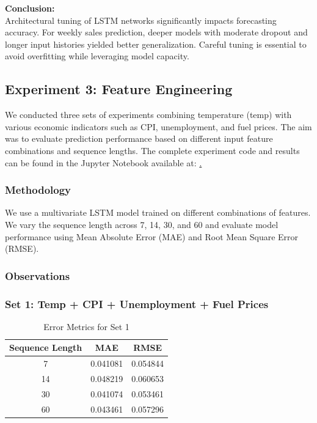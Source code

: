 \documentclass[conference]{IEEEtran}
\begin{document}
\textbf{Conclusion:} \\
Architectural tuning of LSTM networks significantly impacts forecasting accuracy. For weekly sales prediction, deeper models with moderate dropout and longer input histories yielded better generalization. Careful tuning is essential to avoid overfitting while leveraging model capacity.

\subsection{Experiment 3: Feature Engineering}
We conducted three sets of experiments combining temperature (temp) with various economic indicators such as CPI, unemployment, and fuel prices. The aim was to evaluate prediction performance based on different input feature combinations and sequence lengths. The complete experiment code and results can be found in the Jupyter Notebook available at: \href{https://drive.google.com/drive/folders/1Blwt9kzis8_tNPtCi_sRwcQ4WPWRJHMP?usp=sharing}.

\subsubsection{Methodology}
We use a multivariate LSTM model trained on different combinations of features. We vary the sequence length across 7, 14, 30, and 60 and evaluate model performance using Mean Absolute Error (MAE) and Root Mean Square Error (RMSE).

\subsubsection{Observations}

\subsubsection{Set 1: Temp + CPI + Unemployment + Fuel Prices}

\begin{table}[htbp]
\centering
\begin{tabular}{|c|c|c|}
\hline
Sequence Length & MAE & RMSE \\
\hline
7 & 0.041081 & 0.054844 \\
14 & 0.048219 & 0.060653 \\
30 & 0.041074 & 0.053461 \\
60 & 0.043461 & 0.057296 \\
\hline
\end{tabular}
\caption{Error Metrics for Set 1}
\label{tab:set1}
\end{table}
\end{document}
